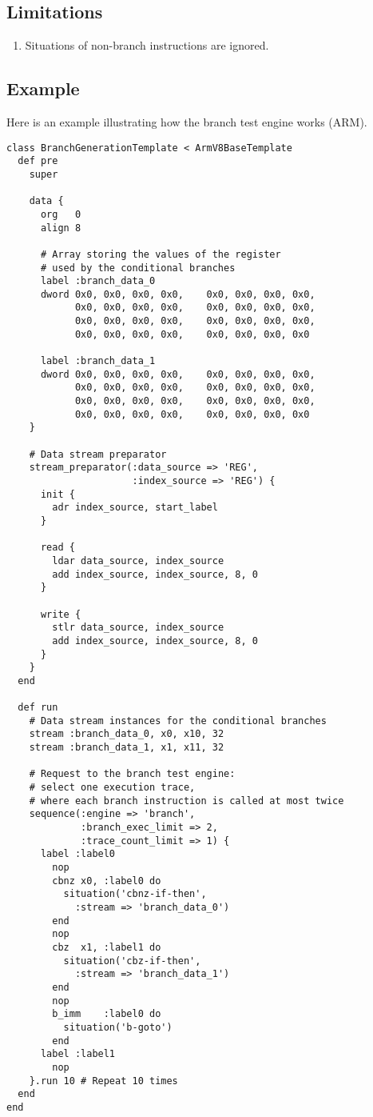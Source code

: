 \subsection{Limitations}

\begin{enumerate}
\item Situations of non-branch instructions are ignored.
\end{enumerate}

\subsection{Example}

Here is an example illustrating how the branch test engine works (ARM).

\begin{lstlisting}
class BranchGenerationTemplate < ArmV8BaseTemplate
  def pre
    super

    data {
      org   0
      align 8

      # Array storing the values of the register
      # used by the conditional branches
      label :branch_data_0
      dword 0x0, 0x0, 0x0, 0x0,    0x0, 0x0, 0x0, 0x0,
            0x0, 0x0, 0x0, 0x0,    0x0, 0x0, 0x0, 0x0,
            0x0, 0x0, 0x0, 0x0,    0x0, 0x0, 0x0, 0x0,
            0x0, 0x0, 0x0, 0x0,    0x0, 0x0, 0x0, 0x0

      label :branch_data_1
      dword 0x0, 0x0, 0x0, 0x0,    0x0, 0x0, 0x0, 0x0,
            0x0, 0x0, 0x0, 0x0,    0x0, 0x0, 0x0, 0x0,
            0x0, 0x0, 0x0, 0x0,    0x0, 0x0, 0x0, 0x0,
            0x0, 0x0, 0x0, 0x0,    0x0, 0x0, 0x0, 0x0
    }

    # Data stream preparator
    stream_preparator(:data_source => 'REG',
                      :index_source => 'REG') {
      init {
        adr index_source, start_label
      }

      read {
        ldar data_source, index_source
        add index_source, index_source, 8, 0
      }

      write {
        stlr data_source, index_source
        add index_source, index_source, 8, 0
      }
    }
  end

  def run
    # Data stream instances for the conditional branches
    stream :branch_data_0, x0, x10, 32
    stream :branch_data_1, x1, x11, 32

    # Request to the branch test engine:
    # select one execution trace,
    # where each branch instruction is called at most twice
    sequence(:engine => 'branch',
             :branch_exec_limit => 2,
             :trace_count_limit => 1) {
      label :label0
        nop
        cbnz x0, :label0 do
          situation('cbnz-if-then',
            :stream => 'branch_data_0')
        end
        nop
        cbz  x1, :label1 do
          situation('cbz-if-then',
            :stream => 'branch_data_1')
        end
        nop
        b_imm    :label0 do
          situation('b-goto')
        end
      label :label1
        nop
    }.run 10 # Repeat 10 times
  end
end
\end{lstlisting}

